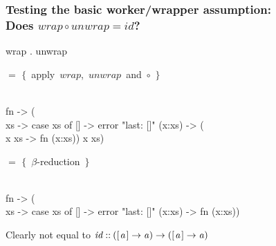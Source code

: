 \documentclass[smaller]{beamer}
\newcommand{\Varid}[1]{\mathit{#1}}
\newcommand{\hint}[2]
  {#1  \mbox{$\{$~{#2}~$\}$}}
\begin{document}
\begin{frame}[fragile] 
\frametitle{Testing the basic worker/wrapper assumption:\\Does \ensuremath{\Varid{wrap}\mathbin{\circ}\Varid{unwrap}\mathrel{=}\Varid{id}}?}
\begin{semiverbatim}
wrap . unwrap 
\end{semiverbatim}
\hint{$=$}{apply \ensuremath{\Varid{wrap}}, \ensuremath{\Varid{unwrap}} and \ensuremath{\mathbin{\circ}}}
\begin{semiverbatim}
\\ fn ->
  (\\ xs -> case xs of
              [] -> error "last: []"
              (x:xs) -> (\\ x xs -> fn (x:xs)) x xs)
\end{semiverbatim}
\hint{$=$}{$\beta$-reduction}
\begin{semiverbatim}
\\ fn ->
  (\\ xs -> case xs of
              [] -> error "last: []"
              (x:xs) -> fn (x:xs))
\end{semiverbatim}

Clearly not equal to \ensuremath{\Varid{id}\mathbin{::}([\mskip1.5mu \Varid{a}\mskip1.5mu]\to \Varid{a})\to ([\mskip1.5mu \Varid{a}\mskip1.5mu]\to \Varid{a})}

\end{frame}
\end{document}
